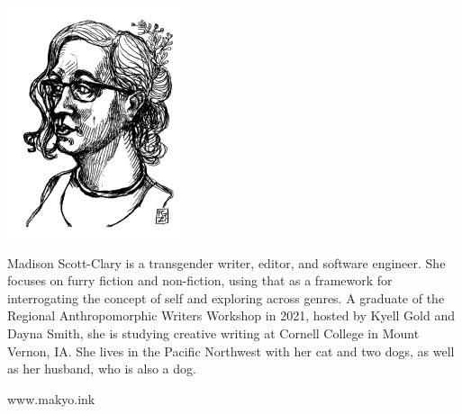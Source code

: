 \begin{center}
  \includegraphics[width=2in]{content/headshot.png}
\end{center}

\noindent Madison Scott-Clary is a transgender writer, editor, and software engineer. She focuses on furry fiction and non-fiction, using that as a framework for interrogating the concept of self and exploring across genres. A graduate of the Regional Anthropomorphic Writers Workshop in 2021, hosted by Kyell Gold and Dayna Smith, she is studying creative writing at Cornell College in Mount Vernon, IA. She lives in the Pacific Northwest with her cat and two dogs, as well as her husband, who is also a dog.

\begin{center}
    www.makyo.ink
\end{center}

\vfill
